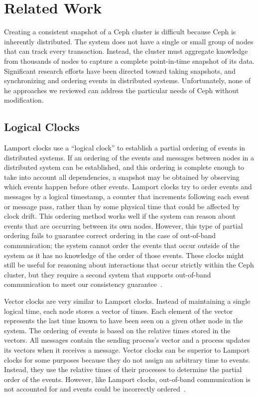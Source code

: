 \chapter{Related Work}
\label{sec:rel-work}

Creating a consistent snapshot of a Ceph cluster is difficult because
Ceph is inherently distributed. The system does not have a single or
small group of nodes that can track every transaction. Instead, the
cluster must aggregate knowledge from thousands of nodes to capture a
complete point-in-time snapshot of its data. Significant research
efforts have been directed toward taking snapshots, and synchronizing
and ordering events in distributed systems. Unfortunately, none of he
approaches we reviewed can address the particular needs of Ceph
without modification.

\section{Logical Clocks}

Lamport clocks use a ``logical clock'' to establish a partial ordering
of events in distributed systems. If an ordering of the events and
messages between nodes in a distributed system can be established, and
this ordering is complete enough to take into account all
dependencies, a snapshot may be obtained by observing which events
happen before other events. Lamport clocks try to order events and
messages by a logical timestamp, a counter that increments following
each event or message pass, rather than by some physical time that
could be affected by clock drift. This ordering method works well if
the system can reason about events that are occurring between its own
nodes. However, this type of partial ordering fails to guarantee
correct ordering in the case of out-of-band communication; the system
cannot order the events that occur outside of the system as it has no
knowledge of the order of those events. These clocks might still be
useful for reasoning about interactions that occur strictly within the
Ceph cluster, but they require a second system that supports
out-of-band communication to meet our consistency
guarantee~\citep{lamport}.

Vector clocks are very similar to Lamport clocks. Instead of
maintaining a single logical time, each node stores a vector of
times. Each element of the vector represents the last time known to
have been seen on a given other node in the system. The ordering of
events is based on the relative times stored in the vectors. All
messages contain the sending process's vector and a process
updates its vectors when it receives a message. Vector clocks can be
superior to Lamport clocks for some purposes because they do not assign
an arbitrary time to events. Instead, they use the relative times of
their processes to determine the partial order of the events. However,
like Lamport clocks, out-of-band communication is not accounted for
and events could be incorrectly ordered~\citep{vector}.

